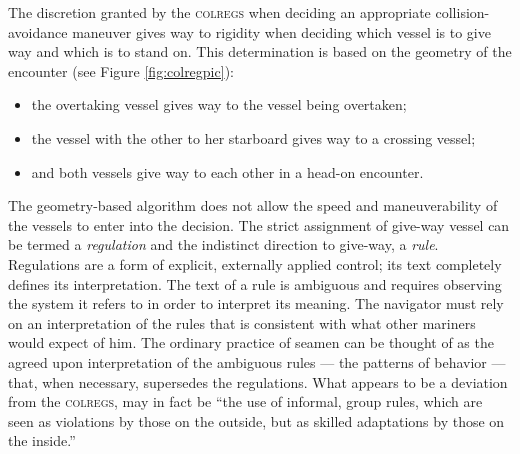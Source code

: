 \documentclass[twoside,symmetric,notoc]{tufte-book}
\begin{document}
\par{%
The discretion granted by the \textsc{colregs} when deciding an appropriate collision-avoidance maneuver gives way to rigidity when deciding which vessel is to give way and which is to stand on. This determination is based on the geometry of the encounter (see Figure \ref{fig:colregpic}): 
\begin{itemize}
    \item the overtaking vessel gives way to the vessel being overtaken;
    \item the vessel with the other to her starboard gives way to a crossing vessel; 
    \item and both vessels give way to each other in a head-on encounter.
\end{itemize} The geometry-based algorithm does not allow the speed and maneuverability of the vessels to enter into the decision. The strict assignment of give-way vessel can be termed a \textit{regulation} and the indistinct direction to give-way, a \textit{rule}. Regulations are a form of explicit, externally applied control; its text completely defines its interpretation. The text of a rule is ambiguous and requires observing the system it refers to in order to interpret its meaning. The navigator must rely on an interpretation of the rules that is consistent with what other mariners would expect of him. The ordinary practice of seamen can be thought of as the agreed upon interpretation of the ambiguous rules --- the patterns of behavior --- that, when necessary, supersedes the regulations. What appears to be a deviation from the \textsc{colregs}, may in fact be ``the use of informal, group rules, which are seen as violations by those on the outside, but as skilled adaptations by those on the inside.''\cite{Hale}
}
\end{document}
